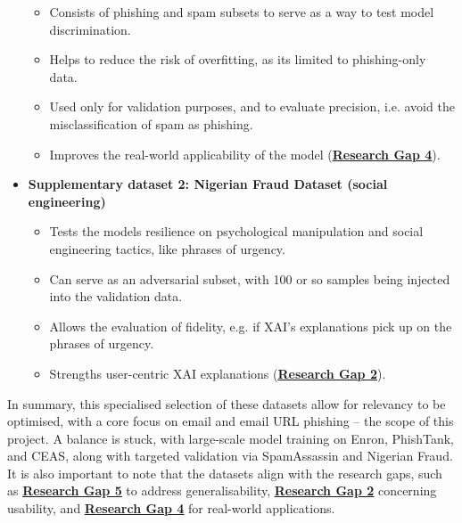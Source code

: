 \begin{itemize}
  \begin{itemize}
    \item Consists of phishing and spam subsets to serve as a way to test model discrimination.
    \item Helps to reduce the risk of overfitting, as its limited to phishing-only data.
    \item Used only for validation purposes, and to evaluate precision, i.e. avoid the misclassification of spam as phishing.
    \item Improves the real-world applicability of the model (\hyperref[research-gap-4]{\uline{\textbf{Research Gap 4}}}).
  \end{itemize}
  \item \textbf{Supplementary dataset 2: Nigerian Fraud Dataset (social engineering)}
  \begin{itemize}
    \item Tests the models resilience on psychological manipulation and social engineering tactics, like phrases of urgency.
    \item Can serve as an adversarial subset, with 100 or so samples being injected into the validation data.
    \item Allows the evaluation of fidelity, e.g. if XAI's explanations pick up on the phrases of urgency.
    \item Strengths user-centric XAI explanations (\hyperref[research-gap-2]{\uline{\textbf{Research Gap 2}}}).
  \end{itemize}
\end{itemize}

\noindent In summary, this specialised selection of these datasets allow for relevancy to be optimised, with a core focus on email and email URL phishing -- the scope of this project. A balance is stuck, with large-scale model training on Enron, PhishTank, and CEAS, along with targeted validation via SpamAssassin and Nigerian Fraud. It is also important to note that the datasets align with the research gaps, such as \hyperref[research-gap-5]{\uline{\textbf{Research Gap 5}}} to address generalisability, \hyperref[research-gap-2]{\uline{\textbf{Research Gap 2}}} concerning usability, and \hyperref[research-gap-4]{\uline{\textbf{Research Gap 4}}} for real-world applications.
